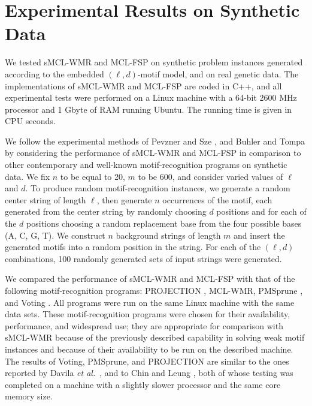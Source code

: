 
\section{Experimental Results on Synthetic Data}

We tested sMCL-WMR and MCL-FSP on synthetic problem instances generated according to the embedded $(\ell, d)$-motif model, and on real genetic data. The implementations of sMCL-WMR and MCL-FSP are coded in C++, and all experimental tests were performed on a Linux machine with a 64-bit 2600 MHz processor and 1 Gbyte of RAM running Ubuntu.   The running time is given in CPU seconds.  

We follow the experimental methods of Pevzner and Sze \cite{PS00}, and Buhler and Tompa \cite{BT02} by considering the performance of sMCL-WMR and MCL-FSP in comparison to other contemporary and well-known motif-recognition programs on synthetic data.  We fix $n$ to be equal to 20, $m$ to be 600, and consider varied values of $\ell$ and $d$. To produce random motif-recognition instances, we generate a random center string of length $\ell$, then generate $n$ occurrences of the motif, each generated from the center string by randomly choosing $d$ positions and for each of the $d$ positions choosing a random replacement base from the four possible bases (A, C, G, T). We construct $n$ background strings of length $m$ and insert the generated motifs into a random position in the string.  For each of the $(\ell, d)$ combinations, 100 randomly generated sets of input strings were generated. 

We compared the performance of sMCL-WMR and MCL-FSP with that of the following motif-recognition programs: PROJECTION \cite{BT02}, MCL-WMR, PMSprune \cite{JBR07}, and Voting \cite{CL05}.  All programs were run on the same Linux machine with the same data sets.  These motif-recognition programs were chosen for their availability, performance, and widespread use; they are appropriate for comparison with sMCL-WMR because of the previously described capability in solving weak motif instances and because of their availability to be run on the described machine. The results of Voting, PMSprune, and PROJECTION are similar to the ones reported by Davila {\em et al.}\ \cite{JBR07}, and to Chin and Leung \cite{CL06}, both of whose testing was completed on a machine with a slightly slower processor and the same core memory size.  


